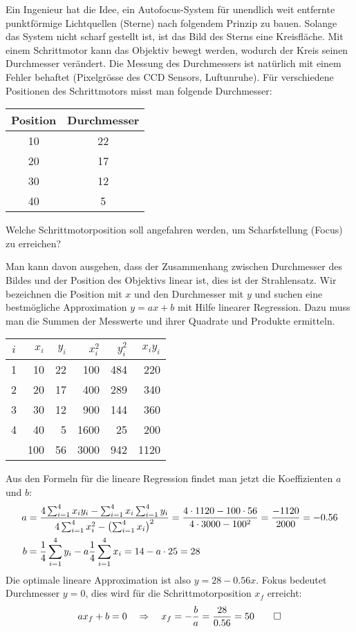 Ein Ingenieur hat die Idee, ein Autofocus-System für unendlich weit
entfernte punktförmige
Lichtquellen (Sterne) nach folgendem Prinzip zu bauen.
Solange das System nicht scharf gestellt ist,
ist das Bild des Sterns eine Kreisfläche.
Mit einem Schrittmotor kann das Objektiv bewegt werden, wodurch der Kreis
seinen Durchmesser verändert. Die Messung des Durchmessers ist 
natürlich mit einem Fehler behaftet (Pixelgrösse des CCD Sensors,
Luftunruhe).
Für verschiedene Positionen des Schrittmotors misst man folgende
Durchmesser:
\begin{center}
\begin{tabular}{|c|c|}
\hline
Position&Durchmesser\\
\hline
10&22\\
20&17\\
30&12\\
40&5\\
\hline
\end{tabular}
\end{center}
Welche Schrittmotorposition soll angefahren werden, um Scharfstellung
(Focus) zu erreichen?


\begin{loesung}
Man kann davon ausgehen, dass der Zusammenhang zwischen Durchmesser
des Bildes und der Position des Objektivs linear ist, dies ist der
Strahlensatz. Wir bezeichnen die Position mit $x$ und den Durchmesser
mit $y$ und suchen eine bestmögliche Approximation $y=ax+b$ mit
Hilfe linearer Regression. Dazu muss man die Summen der Messwerte und
ihrer Quadrate und Produkte ermitteln.
\begin{center}
\begin{tabular}{|c|rr|rrr|}
\hline
$i$&$x_i$&$y_i$&$x_i^2$&$y_i^2$&$x_iy_i$\\
\hline
1& 10&22& 100&484& 220\\
2& 20&17& 400&289& 340\\
3& 30&12& 900&144& 360\\
4& 40& 5&1600& 25& 200\\
\hline
 &100&56&3000&942&1120\\
\hline
\end{tabular}
\end{center}
Aus den Formeln für die lineare Regression findet man jetzt die
Koeffizienten $a$ und $b$:
\begin{align*}
a&=\frac{
4\sum_{i=1}^4 x_iy_i-\sum_{i=1}^4x_i\sum_{i=1}^4y_i
}{
4\sum_{i=1}^4x_i^2-\bigl(\sum_{i=1}^4 x_i\bigr)^2
}
=
\frac{4\cdot 1120-100\cdot 56}{4\cdot 3000-100^2}=\frac{-1120}{2000}=-0.56
\\
b&=\frac14\sum_{i=1}^4y_i-a\frac14\sum_{i=1}^4x_i
=14 - a\cdot 25=28
\end{align*}
Die optimale lineare Approximation ist also $y=28-0.56x$.
Fokus bedeutet Durchmesser $y=0$, dies wird für die Schrittmotorposition
$x_f$ erreicht:
\[
ax_f+b=0\quad\Rightarrow\quad x_f=-\frac{b}{a}=\frac{28}{0.56}=50
\qedhere
\]
\end{loesung}
